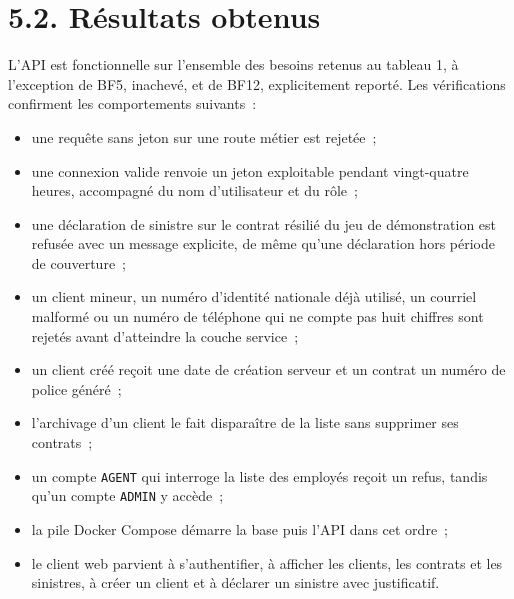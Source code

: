 \documentclass[12pt,a4paper]{report}
\begin{document}
\section*{5.2. Résultats obtenus}
L'API est fonctionnelle sur l'ensemble des besoins retenus au tableau 1, à l'exception de BF5, inachevé, et de BF12, explicitement reporté. Les vérifications confirment les comportements suivants~:
\begin{itemize}\item une requête sans jeton sur une route métier est rejetée~;\end{itemize}
\begin{itemize}\item une connexion valide renvoie un jeton exploitable pendant vingt-quatre heures, accompagné du nom d'utilisateur et du rôle~;\end{itemize}
\begin{itemize}\item une déclaration de sinistre sur le contrat résilié du jeu de démonstration est refusée avec un message explicite, de même qu'une déclaration hors période de couverture~;\end{itemize}
\begin{itemize}\item un client mineur, un numéro d'identité nationale déjà utilisé, un courriel malformé ou un numéro de téléphone qui ne compte pas huit chiffres sont rejetés avant d'atteindre la couche service~;\end{itemize}
\begin{itemize}\item un client créé reçoit une date de création serveur et un contrat un numéro de police généré~;\end{itemize}
\begin{itemize}\item l'archivage d'un client le fait disparaître de la liste sans supprimer ses contrats~;\end{itemize}
\begin{itemize}\item un compte \texttt{AGENT} qui interroge la liste des employés reçoit un refus, tandis qu'un compte \texttt{ADMIN} y accède~;\end{itemize}
\begin{itemize}\item la pile Docker Compose démarre la base puis l'API dans cet ordre~;\end{itemize}
\begin{itemize}\item le client web parvient à s'authentifier, à afficher les clients, les contrats et les sinistres, à créer un client et à déclarer un sinistre avec justificatif.\end{itemize}
\end{document}
